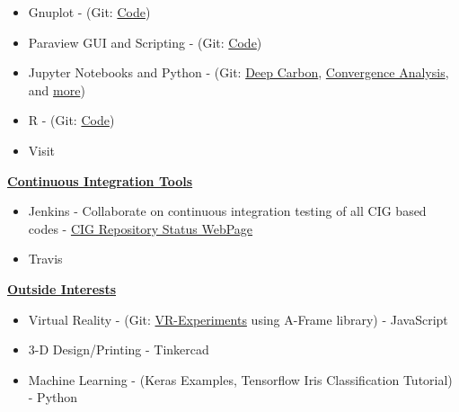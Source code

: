 \documentclass[11pt]{ltxdoc}
\begin{document}
\begin{description}
\begin{itemize}
      	\item Gnuplot - (Git: \href{https://github.com/hlokavarapu/computational_tools/tree/master/Gnuplot_scripts}{Code})
      	
        \item Paraview GUI and Scripting - (Git: \href{https://github.com/hlokavarapu/computational_tools/blob/master/Paraview_scripts/Find_timestep_given_nondim_time_2_comp.py}{Code})
        
        \item Jupyter Notebooks and Python - (Git: \href{https://github.com/hlokavarapu/Prospectus/blob/master/SlideDeck/MeetingPresentation.ipynb}{Deep Carbon}, \href{https://github.com/EGP-CIG-REU/SECOND_PARTICLE_PAPER/blob/master/00JUPYTER_NOTEBOOKS/egp_time_dependent_annulus_v-02/egp_time_dependent_annulus_v-02-Exact.ipynb}{Convergence Analysis}, and \href{https://github.com/hlokavarapu/Geology_Journal/tree/master/00JUPYTER}{more})
       
        \item R - (Git: \href{https://github.com/hlokavarapu/computational_tools/tree/master/R_scripts}{Code})
        
        \item Visit
                
      \end{itemize}
      
    \item[] \textbf{\underline{Continuous Integration Tools}}
  
    \begin{itemize}
      \item Jenkins - Collaborate on continuous integration testing of all CIG based codes - \href{https://blofeld.geodynamics.org/}{CIG Repository Status WebPage}
      \item Travis
    \end{itemize}
    
    \item[] \textbf{\underline{Outside Interests}}
    
      \begin{itemize}
        \item Virtual Reality - (Git: \href{https://github.com/hlokavarapu/VR-Experiments}{VR-Experiments} using A-Frame library) - JavaScript
        \item  3-D Design/Printing - Tinkercad
      
        \item  Machine Learning - (Keras Examples, Tensorflow Iris Classification Tutorial) - Python
      
      \end{itemize}

  \end{description}
\end{document}
